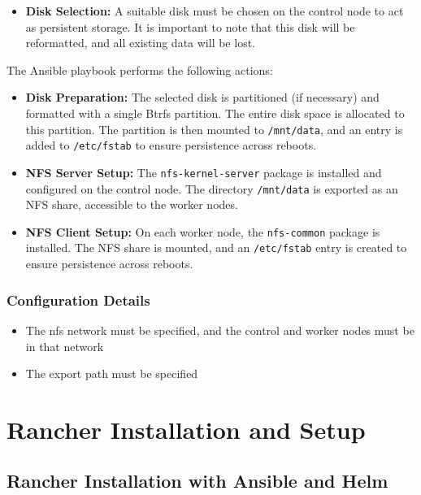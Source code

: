 \begin{itemize}
\item \textbf{Disk Selection:} A suitable disk must be chosen on the control node to act as persistent storage. It is important to note that this disk will be reformatted, and all existing data will be lost.
\end{itemize}

The Ansible playbook performs the following actions:

\begin{itemize}
\item \textbf{Disk Preparation:} The selected disk is partitioned (if necessary) and formatted with a single Btrfs partition. The entire disk space is allocated to this partition. The partition is then mounted to \texttt{/mnt/data}, and an entry is added to \texttt{/etc/fstab} to ensure persistence across reboots.
\item \textbf{NFS Server Setup:} The \texttt{nfs-kernel-server} package is installed and configured on the control node. The directory \texttt{/mnt/data} is exported as an NFS share, accessible to the worker nodes.
\item \textbf{NFS Client Setup:} On each worker node, the \texttt{nfs-common} package is installed. The NFS share is mounted, and an \texttt{/etc/fstab} entry is created to ensure persistence across reboots.
\end{itemize}

\subsubsection{Configuration Details}

\begin{itemize}
    \item The nfs network must be specified, and the control and worker nodes must be in that network
    \item The export path must be specified
\end{itemize}

\section{Rancher Installation and Setup}

\subsection{Rancher Installation with Ansible and Helm}


